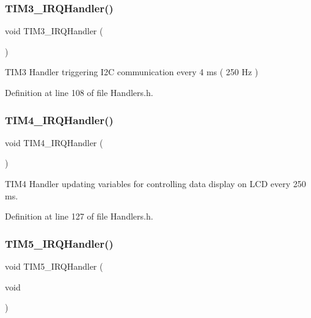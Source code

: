 \mbox{\label{group___handlers_ga2f59315000eb73fdeac2ab44fcd8b972_ga2f59315000eb73fdeac2ab44fcd8b972}} 
\subsubsection{\texorpdfstring{TIM3\_IRQHandler()}{TIM3\_IRQHandler()}}
{\footnotesize\ttfamily void T\+I\+M3\+\_\+\+I\+R\+Q\+Handler (\begin{DoxyParamCaption}{ }\end{DoxyParamCaption})}



T\+I\+M3 Handler triggering I2C communication every 4 ms ( 250 Hz ) 



Definition at line 108 of file Handlers.\+h.

\mbox{\label{group___handlers_ga6e7703924e97aa04dbae6b88adcec3d1_ga6e7703924e97aa04dbae6b88adcec3d1}} 
\subsubsection{\texorpdfstring{TIM4\_IRQHandler()}{TIM4\_IRQHandler()}}
{\footnotesize\ttfamily void T\+I\+M4\+\_\+\+I\+R\+Q\+Handler (\begin{DoxyParamCaption}{ }\end{DoxyParamCaption})}



T\+I\+M4 Handler updating variables for controlling data display on L\+CD every 250 ms. 



Definition at line 127 of file Handlers.\+h.

\mbox{\label{group___handlers_ga5e66446caf21dd90191dc07a13ce2378_ga5e66446caf21dd90191dc07a13ce2378}} 
\subsubsection{\texorpdfstring{TIM5\_IRQHandler()}{TIM5\_IRQHandler()}}
{\footnotesize\ttfamily void T\+I\+M5\+\_\+\+I\+R\+Q\+Handler (\begin{DoxyParamCaption}\item[{void}]{ }\end{DoxyParamCaption})}



